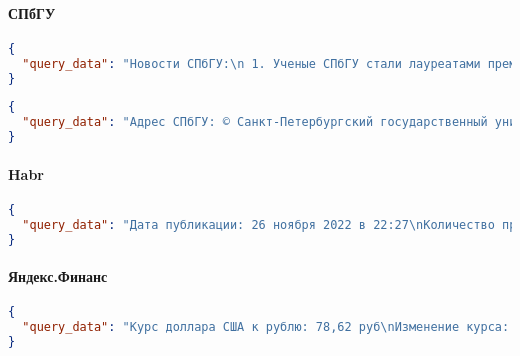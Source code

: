 \paragraph{СПбГУ}
\begin{lstlisting}[language=json, breaklines, keepspaces=true]
{
  "query_data": "Новости СПбГУ:\n 1. Ученые СПбГУ стали лауреатами премии правительства Санкт-Петербурга\n  Дата: 30 мая 2025\n  Ссылка: /news-events/novosti/uchenye-spbgu-stali-laureatami-premii-pravitelstva-sankt-peterburga-0\n\n2. К юбилею почетного профессора СПбГУ Игоря Васильевича Мурина\n  Дата: 29 мая 2025\n  Ссылка: /news-events/novosti/k-yubileyu-pochetnogo-professora-spbgu-igorya-vasilevicha-murina\n\n3. Модельный закон, подготовленный при участии юристов СПбГУ, одобрен Межпарламентской ассамблеей СНГ\n  Дата: 27 мая 2025\n  Ссылка: /news-events/novosti/modelnyy-zakon-podgotovlennyy-pri-uchastii-yuristov-spbgu-odobren\n\n4. Материалы ректорского совещания от 5 мая\n  Дата: 5 мая 2025\n  Ссылка: /news-events/novosti/materialy-rektorskogo-soveschaniya-ot-5-maya\n\n"
}
\end{lstlisting}

\begin{lstlisting}[language=json,breaklines, keepspaces=true]
{
  "query_data": "Адрес СПбГУ: © Санкт-Петербургский государственный университет, 199034, Россия, Санкт-Петербург, Университетская набережная, д. 7–9\n"
}
\end{lstlisting}

\paragraph{Habr}
\begin{lstlisting}[language=json,breaklines, keepspaces=true
{
  "query_data": "Название статьи: Как лучше обучать RNN для прогнозирования временных рядов?\nАвтор: Lev_Perla\n"
}
\end{lstlisting}

\begin{lstlisting}[language=json,breaklines, keepspaces=true]
{
  "query_data": "Дата публикации: 26 ноября 2022 в 22:27\nКоличество просмотров: 22842\n"
}
\end{lstlisting}

\paragraph{Яндекс.Финанс}
\begin{lstlisting}[language=json,breaklines, keepspaces=true]
{
  "query_data": "Курс доллара США к рублю: 78,62 руб\nИзменение курса: Цена опустилась на −2,88 руб\nОтносительное изменение: −2,88 руб (3,53%)\nИсточник: ЦБ РФ\n"
}
\end{lstlisting}

